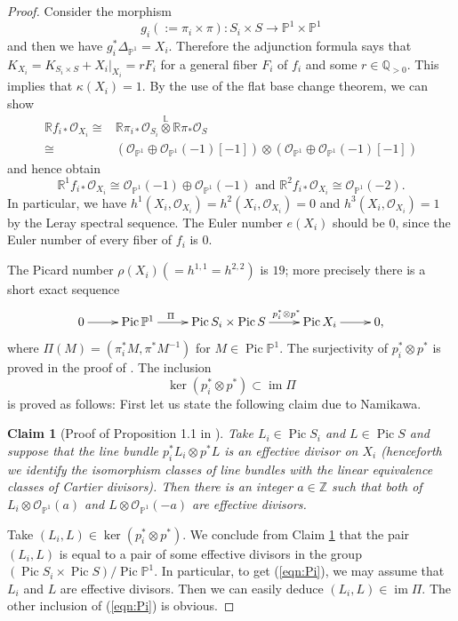 \documentclass[a4paper,11pt]{article}
\newtheorem{cla}[thm]{Claim}
\theoremstyle{definition}\newtheorem{defn}[thm]{Definition}
\theoremstyle{remark}\newtheorem{remark}[thm]{Remark}
\numberwithin{equation}{section}
\newcommand{\LL}{\ensuremath{\mathbb{L}}}
\newcommand{\ltensor}{\overset{\LL}{\otimes}}
\newcommand{\Pic}{\ensuremath{\operatorname{Pic}}}
\newcommand{\mc}{\mathcal}
\newcommand{\mb}{\mathbb}
\newcommand{\PP}{\mathbb P}
\newcommand{\Z}{\mathbb Z}
\newcommand{\Q}{\mathbb Q}
\def\im{\mathop{\mathrm{im}}\nolimits}
\def\ker{\mathop{\mathrm{ker}}\nolimits}
\begin{document}
\begin{proof}
Consider the morphism
$$
g_i (:=\pi_i \times \pi )\colon S_i\times S \to \PP^1\times \PP ^1
$$
%
and then we have $g_i^*\Delta_{\PP ^1} = X_i$.
Therefore the adjunction formula says that 
$K_{X_i}=K_{{S_i}\times S}+X_i|_{X_i}=rF_i$ for a general fiber 
$F_i$ of $f_i$ and some $r\in \Q_{>0}$. This implies that $\kappa (X_i)=1$.
By the use of the flat base change theorem, 
we can show 
%
\begin{align*}
\mb Rf_{i*}\mc O_{X_i}
\cong& \mb R\pi_{i*}\mc O_{S_i}\ltensor \mb R{\pi}_{*}\mc O_{S}\\
\cong& (\mc O_{\PP^1}\oplus \mc O_{\PP^1}(-1)[-1]) 
     \otimes (\mc O_{\PP^1}\oplus \mc O_{\PP^1}(-1)[-1]) 
\end{align*}
%
and hence obtain 
$$
\mb R^1f_{i*}\mc O_{X_i}\cong \mc O_{\PP^1}(-1)\oplus \mc O_{\PP^1}(-1) 
\text{ and }
\mb R^2f_{i*}\mc O_{X_i}\cong \mc O_{\PP^1}(-2).
$$
In particular, we  have $h^1(X_i,\mc O_{X_i})=h^2(X_i,\mc O_{X_i})=0$
and 
$h^3(X_i,\mc O_{X_i})=1$
by the Leray spectral sequence.
The Euler number $e(X_i)$ should be $0$, since the Euler number of 
every fiber of $f_i$ is $0$. 

The Picard number $\rho (X_i)(=h^{1,1}=h^{2,2})$ is $19$; 
more precisely there is a short exact sequence
\[
\xymatrix{ 
0\ar[r]& \Pic \PP ^1 \ar[r]^{\Pi\qquad }& \Pic S_i\times \Pic S
\ar[r]^{\qquad p_i^*\otimes p^*} &\Pic X_i\ar[r] &0,
}
\]
%
where $\Pi (M)=(\pi^*_iM , \pi^*M^{-1})$ for $M\in \Pic \PP ^1$.
The surjectivity of $p_i^*\otimes p^*$ is proved in the proof of 
\cite[Proposition 1.1]{Na91}.
The inclusion 
%
\begin{equation}\label{eqn:Pi}
\ker (p_i^*\otimes p^*)\subset \im \Pi
\end{equation}
%
is proved as follows:
First let us state the following claim due to Namikawa.
%
\begin{cla}[Proof of Proposition 1.1 in \cite{Na91}]\label{cla:namikawa}
Take $L_i\in \Pic S_i$ and $L\in\Pic S$ and suppose that
the line bundle $p_i^*L_i\otimes {p}^*L$ is an effective divisor on $X_i$
(henceforth we identify the isomorphism classes of 
line bundles with the linear equivalence classes of Cartier divisors).
Then there is an integer $a\in \Z$ such that 
both of $L_i\otimes\mc O_{\PP^1}(a)$ and 
$L\otimes \mc O_{\PP^1}(-a)$ are  
effective divisors.
\end{cla}
%
%
\noindent
Take $(L_i,L)\in \ker (p_i^*\otimes p^*)$.
We conclude from Claim \ref{cla:namikawa} that 
the pair $(L_i, L)$ is equal to a pair of some effective divisors
 in the group $(\Pic S_i\times \Pic S)/\Pic \PP ^1$.
In particular, to get (\ref{eqn:Pi}),
we may assume that $L_i$ and $L$ are effective divisors.
Then we can easily deduce $(L_i,L) \in \im \Pi$.
 The other inclusion of (\ref{eqn:Pi}) is obvious.


\end{proof}
\end{document}
